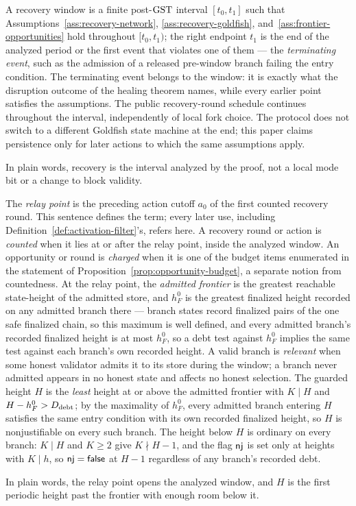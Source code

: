 \begin{definition}\label{def:recovery-window}
A recovery window is a finite post-\(\mathrm{GST}\) interval
\([t_0,t_1]\) such that Assumptions~\ref{ass:recovery-network},
\ref{ass:recovery-goldfish}, and~\ref{ass:frontier-opportunities}
hold throughout \([t_0,t_1)\); the right endpoint \(t_1\) is the
end of the analyzed period or the first event that violates one of
them --- the \emph{terminating event}, such as the admission of a
released pre-window branch failing the entry condition.  The
terminating event belongs to the window: it is exactly what the
disruption outcome of the healing theorem names, while every earlier
point satisfies the assumptions.
The public recovery-round schedule continues throughout the interval,
independently of local fork choice.  The protocol does not switch to a
different Goldfish state machine at the end; this paper claims persistence
only for later actions to which the same assumptions apply.

In plain words, recovery is the interval analyzed by the proof, not a local
mode bit or a change to block validity.
\end{definition}

\begin{definition}
\label{def:relay-frontier}
The \emph{relay point} is the preceding action cutoff \(a_0\) of the
first counted recovery round.  This sentence defines the term; every
later use, including Definition~\ref{def:activation-filter}'s, refers
here.  A recovery round or action is \emph{counted} when it lies at or
after the relay point, inside the analyzed window.  An opportunity or
round is \emph{charged} when it is one of the budget items enumerated
in the statement of Proposition~\ref{prop:opportunity-budget}, a
separate notion from countedness.  At the relay point, the
\emph{admitted frontier} is the greatest reachable state-height of the
admitted store, and \(h_F^0\) is the greatest finalized height
recorded on any admitted branch there --- branch states record
finalized pairs of the one safe finalized chain, so this maximum is
well defined, and every admitted branch's recorded finalized height is
at most \(h_F^0\), so a debt test against \(h_F^0\) implies the
same test against each branch's own recorded height.  A valid branch
is \emph{relevant} when some honest validator admits it to its store
during the window; a branch never admitted appears in no honest state
and affects no honest selection.  The guarded height \(H\) is the
\emph{least} height at or above the admitted frontier with
\(K\mid H\) and \(H-h_F^0>D_{\rm debt}\); by the maximality of
\(h_F^0\), every admitted branch entering \(H\) satisfies the same
entry condition with its own recorded finalized height, so \(H\) is
nonjustifiable on every such branch.  The height below \(H\) is
ordinary on every branch: \(K\mid H\) and \(K\geq2\) give
\(K\nmid H-1\), and the flag \(\mathsf{nj}\) is set only at heights with
\(K\mid h\), so \(\mathsf{nj}=\mathsf{false}\) at \(H-1\) regardless
of any branch's recorded debt.

In plain words, the relay point opens the analyzed window, and \(H\)
is the first periodic height past the frontier with enough room below
it.
\end{definition}

